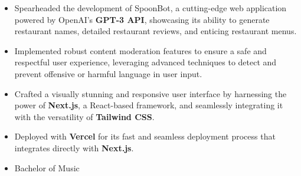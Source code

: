 \documentclass[10pt,a4paper,withhyper]{altacv}
\begin{document}
\begin{paracol}{2}
  \begin{itemize}
    \item Spearheaded the development of SpoonBot, a cutting-edge web application powered by OpenAI's \textbf{GPT-3 API}, showcasing its ability to generate restaurant names, detailed restaurant reviews, and enticing restaurant menus.
    \item Implemented robust content moderation features to ensure a safe and respectful user experience, leveraging advanced techniques to detect and prevent offensive or harmful language in user input.
    \item Crafted a visually stunning and responsive user interface by harnessing the power of \textbf{Next.js}, a React-based framework, and seamlessly integrating it with the versatility of \textbf{Tailwind CSS}.
    \item Deployed with \textbf{Vercel} for its fast and seamless deployment process that integrates directly with \textbf{Next.js}.
  \end{itemize}

  \switchcolumn

  \begin{itemize}
    \item Bachelor of Music
  \end{itemize}



\end{paracol}
\end{document}
